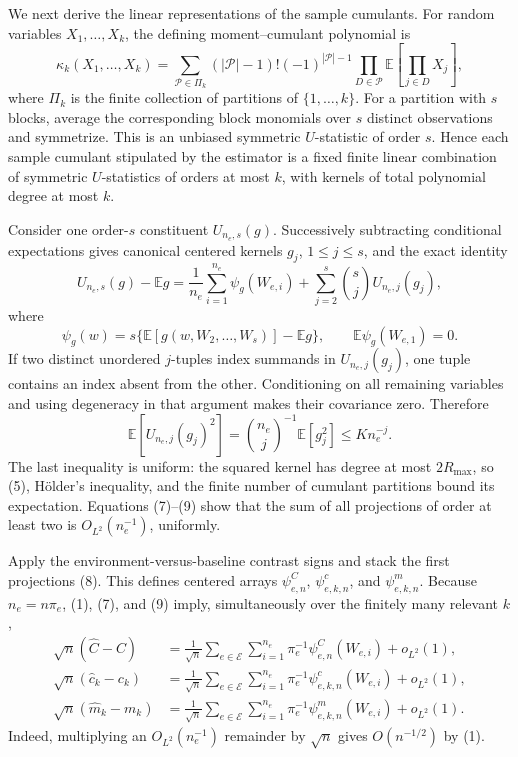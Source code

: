 We next derive the linear representations of the sample cumulants.  For random variables \(X_1,\ldots,X_k\), the defining moment--cumulant polynomial is
\[
 \kappa_k(X_1,\ldots,X_k)
 =\sum_{\mathcal P\in\Pi_k}
 (|\mathcal P|-1)!(-1)^{|\mathcal P|-1}
 \prod_{D\in\mathcal P}
 \mathbb E\!\left[\prod_{j\in D}X_j\right], \tag{6}
\]
where \(\Pi_k\) is the finite collection of partitions of \(\{1,\ldots,k\}\).  For a partition with \(s\) blocks, average the corresponding block monomials over \(s\) distinct observations and symmetrize.  This is an unbiased symmetric \(U\)-statistic of order \(s\).  Hence each sample cumulant stipulated by the estimator is a fixed finite linear combination of symmetric \(U\)-statistics of orders at most \(k\), with kernels of total polynomial degree at most \(k\).

Consider one order-\(s\) constituent \(U_{n_e,s}(g)\).  Successively subtracting conditional expectations gives canonical centered kernels \(g_j\), \(1\leq j\leq s\), and the exact identity
\[
 U_{n_e,s}(g)-\mathbb Eg
 =\frac1{n_e}\sum_{i=1}^{n_e}\psi_g(W_{e,i})
  +\sum_{j=2}^s {s\choose j}U_{n_e,j}(g_j), \tag{7}
\]
where
\[
 \psi_g(w)=s\{\mathbb E[g(w,W_2,\ldots,W_s)]-\mathbb Eg\},
 \qquad \mathbb E\psi_g(W_{e,1})=0. \tag{8}
\]
If two distinct unordered \(j\)-tuples index summands in \(U_{n_e,j}(g_j)\), one tuple contains an index absent from the other.  Conditioning on all remaining variables and using degeneracy in that argument makes their covariance zero.  Therefore
\[
 \mathbb E\!\left[U_{n_e,j}(g_j)^2\right]
 ={n_e\choose j}^{-1}\mathbb E[g_j^2]
 \leq K n_e^{-j}. \tag{9}
\]
The last inequality is uniform: the squared kernel has degree at most \(2R_{\max}\), so (5), H\"older's inequality, and the finite number of cumulant partitions bound its expectation.  Equations (7)--(9) show that the sum of all projections of order at least two is \(O_{L^2}(n_e^{-1})\), uniformly.

Apply the environment-versus-baseline contrast signs and stack the first projections (8).  This defines centered arrays \(\psi^C_{e,n}\), \(\psi^c_{e,k,n}\), and \(\psi^m_{e,k,n}\).  Because \(n_e=n\pi_e\), (1), (7), and (9) imply, simultaneously over the finitely many relevant \(k\),
\[
 \begin{aligned}
 \sqrt n(\widehat C-C)
 &=\frac1{\sqrt n}\sum_{e\in\mathcal E}\sum_{i=1}^{n_e}
     \pi_e^{-1}\psi^C_{e,n}(W_{e,i})+o_{L^2}(1),\\
 \sqrt n(\widehat c_k-c_k)
 &=\frac1{\sqrt n}\sum_{e\in\mathcal E}\sum_{i=1}^{n_e}
     \pi_e^{-1}\psi^c_{e,k,n}(W_{e,i})+o_{L^2}(1),\\
 \sqrt n(\widehat m_k-m_k)
 &=\frac1{\sqrt n}\sum_{e\in\mathcal E}\sum_{i=1}^{n_e}
     \pi_e^{-1}\psi^m_{e,k,n}(W_{e,i})+o_{L^2}(1).
 \end{aligned} \tag{10}
\]
Indeed, multiplying an \(O_{L^2}(n_e^{-1})\) remainder by \(\sqrt n\) gives \(O(n^{-1/2})\) by (1).

